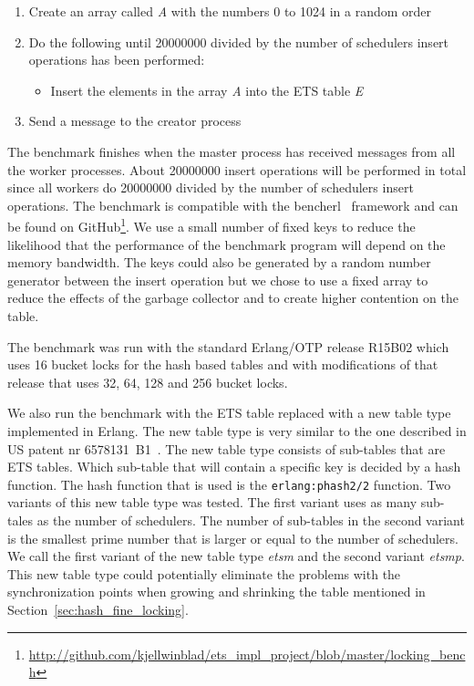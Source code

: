 \documentclass[aps,pre,preprint,nofootinbib]{revtex4}
\begin{document}
\begin{enumerate}
 \item Create an array called \emph{A} with the numbers 0 to 1024 in a random order
 \item Do the following until 20000000 divided by the number of schedulers insert operations has been performed:
 \begin{itemize}
  \item Insert the elements in the array \emph{A} into the ETS table \emph{E}
 \end{itemize}
 \item Send a message to the creator process
\end{enumerate}

The benchmark finishes when the master process has received messages from all the worker processes.
About 20000000 insert operations will be performed in total since all workers do 20000000 divided by the number of schedulers insert operations.
The benchmark is compatible with the bencherl~\cite{BENCHERL} framework and can be found on GitHub\footnote{\url{http://github.com/kjellwinblad/ets\_impl\_project/blob/master/locking\_bench}}. 
We use a small number of fixed keys to reduce the likelihood that the performance of the benchmark program will depend on the memory bandwidth.
The keys could also be generated by a random number generator between the insert operation but we chose to use a fixed array to reduce the effects of the garbage collector and to create higher contention on the table.

The benchmark was run with the standard Erlang/OTP release R15B02 which uses 16 bucket locks for the hash based tables and with modifications of that release that uses 32, 64, 128 and 256 bucket locks.

We also run the benchmark with the ETS table replaced with a new table type implemented in Erlang.
The new table type is very similar to the one described in US patent nr 6578131~B1~\cite{USPATENT6578131B1}.
The new table type consists of sub-tables that are ETS tables.
Which sub-table that will contain a specific key is decided by a hash function.
The hash function that is used is the \verb|erlang:phash2/2| function.
Two variants of this new table type was tested.
The first variant uses as many sub-tales as the number of schedulers.
The number of sub-tables in the second variant is the smallest prime number that is larger or equal to the number of schedulers.
We call the first variant of the new table type \emph{etsm} and the second variant \emph{etsmp}.
This new table type could potentially eliminate the problems with the synchronization points when growing and shrinking the table mentioned in Section~\ref{sec:hash_fine_locking}.
\end{document}
